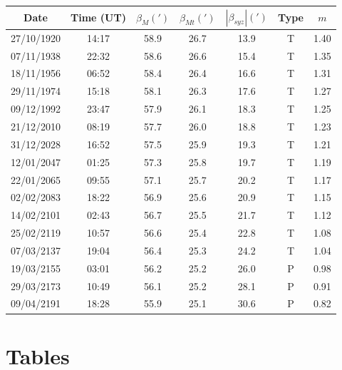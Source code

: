 \begin{center}
\begin{tabular}{ccccccc}
Date & Time (UT) & $\beta_{M}(')$ & $\beta_{Mt}(')$ & $|\beta_{syz}|(')$& Type & $m$\\\hline
27/10/1920 &  14:17 & 58.9 & 26.7 & 13.9 & T & 1.40\\
07/11/1938 &  22:32 & 58.6 & 26.6 & 15.4 & T & 1.35\\
18/11/1956 &  06:52 & 58.4 & 26.4 & 16.6 & T & 1.31\\
29/11/1974 &  15:18 & 58.1 & 26.3 & 17.6 & T & 1.27\\
09/12/1992 &  23:47 & 57.9 & 26.1 & 18.3 & T & 1.25\\
21/12/2010 &  08:19 & 57.7 & 26.0 & 18.8 & T & 1.23\\
31/12/2028 &  16:52 & 57.5 & 25.9 & 19.3 & T & 1.21\\
12/01/2047 &  01:25 & 57.3 & 25.8 & 19.7 & T & 1.19\\
22/01/2065 &  09:55 & 57.1 & 25.7 & 20.2 & T & 1.17\\
02/02/2083 &  18:22 & 56.9 & 25.6 & 20.9 & T & 1.15\\
14/02/2101 &  02:43 & 56.7 & 25.5 & 21.7 & T & 1.12\\
25/02/2119 &  10:57 & 56.6 & 25.4 & 22.8 & T & 1.08\\
07/03/2137 &  19:04 & 56.4 & 25.3 & 24.2 & T & 1.04\\
19/03/2155 &  03:01 & 56.2 & 25.2 & 26.0 & P & 0.98\\
29/03/2173 &  10:49 & 56.1 & 25.2 & 28.1 & P & 0.91\\
09/04/2191 &  18:28 & 55.9 & 25.1 & 30.6 & P & 0.82\\
\end{tabular}
\end{center}

\clearpage
\section{Tables}

